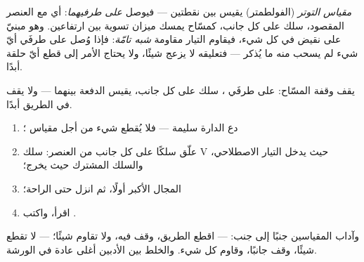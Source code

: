 \begin{definition}\label{def:g8:voltage-voltmeter:voltmeter}
\emph{مقياس التوتر} (الفولطمتر) يقيس
 بين نقطتين --- فيوصل \emph{على طرفيهما}: أي \emph{} مع العنصر المقصود، سلك على كل جانب، كمسّاح يمسك ميزان
تسوية بين ارتفاعين. وهو مبنيّ على نقيض  في كل شيء،
فيقاوم التيار مقاومة \emph{شبه تامّة}: فإذا وُصل على طرفَي أيّ
شيء لم يسحب منه ما يُذكر --- فتعليقه لا يزعج شيئًا، ولا يحتاج
الأمر إلى قطع أيّ حلقة أبدًا.
\end{definition}

\begin{omfigure}

{\small {} يقف وقفة المسّاح: على طرفَي ، سلك
على كل جانب، يقيس الدفعة بينهما --- ولا يقف في الطريق أبدًا.}
\end{omfigure}

\begin{method}\label{met:g8:voltage-voltmeter:measure}
\begin{enumerate}
  \item دع الدارة سليمة --- فلا يُقطع شيء من أجل مقياس ؛
  \item علّق سلكًا على كل جانب من العنصر: سلك \unit{V} حيث يدخل
        التيار الاصطلاحي، والسلك المشترك حيث يخرج؛
  \item المجال الأكبر أولًا، ثم انزل حتى الراحة؛
  \item اقرأ، واكتب .
\end{enumerate}
وآداب المقياسين جنبًا إلى جنب:  --- اقطع الطريق،
وقف فيه، ولا تقاوم شيئًا؛  --- لا تقطع شيئًا، وقف
جانبًا، وقاوم كل شيء. والخلط بين الأدبين أغلى عادة في الورشة.
\end{method}

